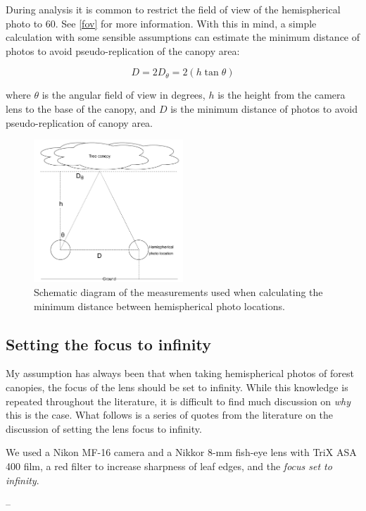 \documentclass[11pt,a4paper]{article}
\begin{document}
During analysis it is common to restrict the field of view of the hemispherical photo to 60\textdegree{}. See \autoref{fov} for more information. With this in mind, a simple calculation with some sensible assumptions can estimate the minimum distance of photos to avoid pseudo-replication of the canopy area:

\begin{equation}
	D = 2D_{\theta} = 2(h \tan{\theta})
\end{equation}

where $\theta$ is the angular field of view in degrees, $h$ is the height from the camera lens to the base of the canopy, and $D$ is the minimum distance of photos to avoid pseudo-replication of canopy area.

\begin{figure}[H]
\centering
	\includegraphics[width=0.5\textwidth]{canopy_trig.drawio}
	\caption{Schematic diagram of the measurements used when calculating the minimum distance between hemispherical photo locations.}
	\label{canopy_trig}
\end{figure}

\subsection{Setting the focus to infinity} 

My assumption has always been that when taking hemispherical photos of forest canopies, the focus of the lens should be set to infinity. While this knowledge is repeated throughout the literature, it is difficult to find much discussion on \textit{why} this is the case. What follows is a series of quotes from the literature on the discussion of setting the lens focus to infinity.

\begin{minipage}{\linewidth}
\begin{framed}
We used a Nikon MF-16 camera and a Nikkor 8-mm fish-eye lens with TriX ASA 400 film, a red filter to increase sharpness of leaf edges, and the \textit{focus set to infinity}.

-- \citealt{Englund2000}
\end{framed}
\end{minipage}
\end{document}

